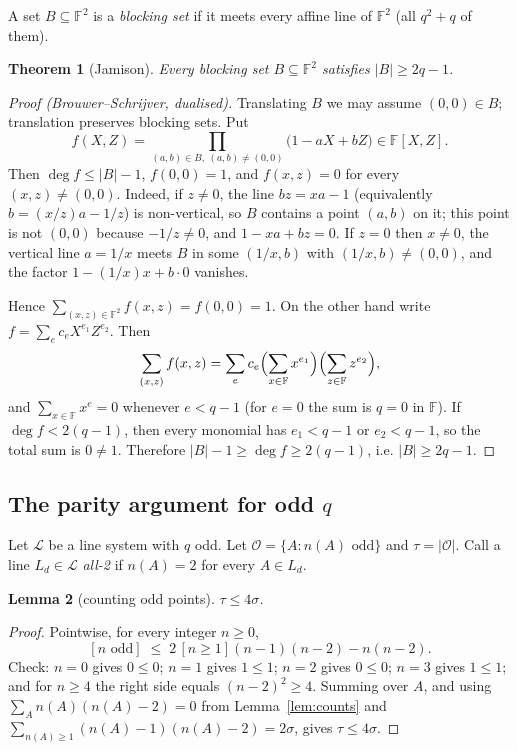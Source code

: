 \documentclass[11pt,a4paper]{article}
\newtheorem{theorem}{Theorem}[section]
\newtheorem{lemma}[theorem]{Lemma}
\theoremstyle{definition}
\theoremstyle{remark}
\newcommand{\F}{\mathbb{F}}
\newcommand{\Lset}{\mathcal{L}}
\newcommand{\Oset}{\mathcal{O}}
\begin{document}
A set $B\subseteq\F^2$ is a \emph{blocking set} if it meets every affine line of $\F^2$ (all $q^2+q$
of them).

\begin{theorem}[Jamison]\label{thm:jamison}
Every blocking set $B\subseteq\F^2$ satisfies $|B|\ge 2q-1$.
\end{theorem}

\begin{proof}[Proof (Brouwer--Schrijver, dualised)]
Translating $B$ we may assume $(0,0)\in B$; translation preserves blocking sets. Put
\[
f(X,Z)=\prod_{(a,b)\in B,\ (a,b)\ne(0,0)}\bigl(1-aX+bZ\bigr)\in\F[X,Z].
\]
Then $\deg f\le |B|-1$, $f(0,0)=1$, and $f(x,z)=0$ for every $(x,z)\ne(0,0)$. Indeed, if $z\ne0$, the
line $bz=xa-1$ (equivalently $b=(x/z)a-1/z$) is non-vertical, so $B$ contains a point $(a,b)$ on it;
this point is not $(0,0)$ because $-1/z\ne0$, and $1-xa+bz=0$. If $z=0$ then $x\ne0$, the vertical
line $a=1/x$ meets $B$ in some $(1/x,b)$ with $(1/x,b)\ne(0,0)$, and the factor
$1-(1/x)x+b\cdot0$ vanishes.

Hence $\sum_{(x,z)\in\F^2}f(x,z)=f(0,0)=1$. On the other hand write $f=\sum_e c_e X^{e_1}Z^{e_2}$.
Then
\[
\sum_{(x,z)}f(x,z)=\sum_e c_e\Bigl(\sum_{x\in\F}x^{e_1}\Bigr)\Bigl(\sum_{z\in\F}z^{e_2}\Bigr),
\]
and $\sum_{x\in\F}x^{e}=0$ whenever $e<q-1$ (for $e=0$ the sum is $q=0$ in $\F$). If $\deg f<2(q-1)$,
then every monomial has $e_1<q-1$ or $e_2<q-1$, so the total sum is $0\ne1$. Therefore
$|B|-1\ge\deg f\ge2(q-1)$, i.e. $|B|\ge2q-1$.
\end{proof}

\subsection{The parity argument for odd $q$}

Let $\Lset$ be a line system with $q$ odd. Let $\Oset=\{A: n(A)\text{ odd}\}$ and $\tau=|\Oset|$.
Call a line $L_d\in\Lset$ \emph{all-2} if $n(A)=2$ for every $A\in L_d$.

\begin{lemma}[counting odd points]\label{lem:taubound}
$\tau\le 4\sigma$.
\end{lemma}

\begin{proof}
Pointwise, for every integer $n\ge0$,
\[
[n\text{ odd}]\;\le\;2\,[n\ge1](n-1)(n-2)-n(n-2).
\]
Check: $n=0$ gives $0\le0$; $n=1$ gives $1\le 1$; $n=2$ gives $0\le0$; $n=3$ gives $1\le 1$; and for
$n\ge4$ the right side equals $(n-2)^2\ge4$. Summing over $A$, and using $\sum_A n(A)(n(A)-2)=0$
from Lemma~\ref{lem:counts} and $\sum_{n(A)\ge1}(n(A)-1)(n(A)-2)=2\sigma$, gives $\tau\le 4\sigma$.
\end{proof}
\end{document}
